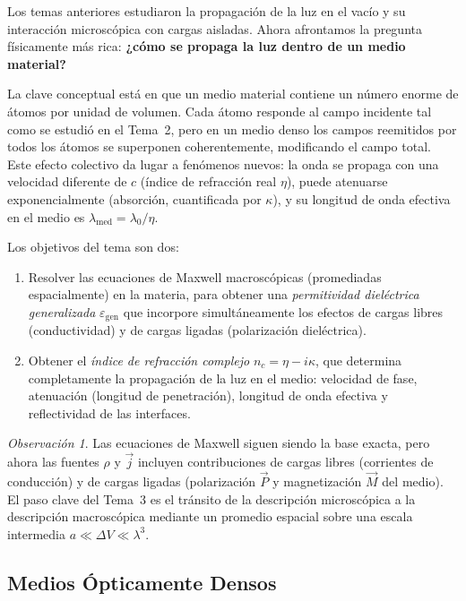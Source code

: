 \documentclass[12pt, a4paper]{article}
\theoremstyle{plain}
\theoremstyle{definition}
\theoremstyle{remark}
\newtheorem*{observacion}{Observación}
\newcommand{\ve}[1]{\vec{#1}}
\begin{document}
Los temas anteriores estudiaron la propagación de la luz en el vacío y su
interacción microscópica con cargas aisladas. Ahora afrontamos la pregunta
físicamente más rica: \textbf{¿cómo se propaga la luz dentro de un medio
material?}

La clave conceptual está en que un medio material contiene un número enorme de
átomos por unidad de volumen. Cada átomo responde al campo incidente tal como
se estudió en el Tema~2, pero en un medio denso los campos reemitidos por todos
los átomos se superponen coherentemente, modificando el campo total. Este
efecto colectivo da lugar a fenómenos nuevos: la onda se propaga con una
velocidad diferente de $c$ (índice de refracción real $\eta$), puede
atenuarse exponencialmente (absorción, cuantificada por $\kappa$), y su
longitud de onda efectiva en el medio es $\lambda_\text{med}=\lambda_0/\eta$.

Los objetivos del tema son dos:
\begin{enumerate}
  \item Resolver las ecuaciones de Maxwell macroscópicas (promediadas
        espacialmente) en la materia, para obtener una \emph{permitividad
        dieléctrica generalizada} $\varepsilon_\text{gen}$ que incorpore
        simultáneamente los efectos de cargas libres (conductividad) y de
        cargas ligadas (polarización dieléctrica).
  \item Obtener el \emph{índice de refracción complejo} $n_c = \eta - i\kappa$,
        que determina completamente la propagación de la luz en el medio:
        velocidad de fase, atenuación (longitud de penetración), longitud de
        onda efectiva y reflectividad de las interfaces.
\end{enumerate}

\begin{observacion}
Las ecuaciones de Maxwell siguen siendo la base exacta, pero ahora las fuentes
$\rho$ y $\ve{j}$ incluyen contribuciones de cargas libres (corrientes de
conducción) y de cargas ligadas (polarización $\ve{P}$ y magnetización $\ve{M}$
del medio). El paso clave del Tema~3 es el tránsito de la descripción
microscópica a la descripción macroscópica mediante un promedio espacial
sobre una escala intermedia $a \ll \Delta V \ll \lambda^3$.
\end{observacion}

\subsection{Medios Ópticamente Densos}
\end{document}
